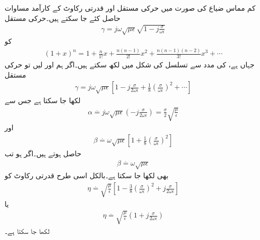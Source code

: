 کم مماس ضیاع کی صورت میں حرکی مستقل اور قدرتی رکاوٹ کے کارآمد مساوات حاصل کئے جا سکتے ہیں۔حرکی مستقل
\begin{align*}
\gamma = j \omega \sqrt{\mu \epsilon}\sqrt{1-j \frac{\sigma}{\omega \epsilon}}
\end{align*}
کو 
\begin{align*}
(1+x)^n=1+\frac{n}{1!}x+\frac{n(n-1)}{2!}x^2+\frac{n(n-1)(n-2)}{3!}x^3+\cdots
\end{align*}
جہاں  ہے، کی مدد سے  تسلسل کی شکل میں لکھ سکتے ہیں۔اگر ہم  اور  لیں تو حرکی مستقل 
\begin{align*}
\gamma=j \omega \sqrt{\mu \epsilon} \left[1-j\frac{\sigma}{2\omega \epsilon}+\frac{1}{8}\left(\frac{\sigma}{\omega \epsilon}\right)^2+\cdots \right]
\end{align*}
 لکھا جا سکتا ہے جس سے
\begin{align}\label{مساوات_موج_تقلیلی_سادہ}
\alpha \overset{.}{=} j \omega \sqrt{\mu \epsilon} \left(-j\frac{\sigma}{2\omega \epsilon} \right)=\frac{\sigma}{2}\sqrt{\frac{\mu}{\epsilon}}
\end{align}
اور 
\begin{align}\label{مساوات_موج_زاویائی_سادہ_الف}
\beta \overset{.}{=}\omega \sqrt{\mu \epsilon}\left[1+\frac{1}{8}\left(\frac{\sigma}{\omega \epsilon}\right)^2 \right]
\end{align}
حاصل ہوتے ہیں۔اگر  ہو تب
\begin{align}\label{مساوات_موج_زاویائی_سادہ_ب}
\beta \overset{.}{=}\omega \sqrt{\mu \epsilon}
\end{align}
بھی لکھا جا سکتا ہے۔بالکل اسی طرح قدرتی رکاوٹ کو
\begin{align}\label{مساوات_موج_رکاوٹ_سادہ_الف}
\eta \overset{.}{=} \sqrt{\frac{\mu}{\epsilon}} \left[1-\frac{3}{8}\left(\frac{\sigma}{\omega \epsilon}\right)^2 +j \frac{\sigma}{2\omega \epsilon}\right]
\end{align}
یا
\begin{align}\label{مساوات_موج_رکاوٹ_سادہ_ب}
\eta \overset{.}{=} \sqrt{\frac{\mu}{\epsilon}} \left(1 +j \frac{\sigma}{2\omega \epsilon}\right)
\end{align}
لکھا جا سکتا ہے۔

